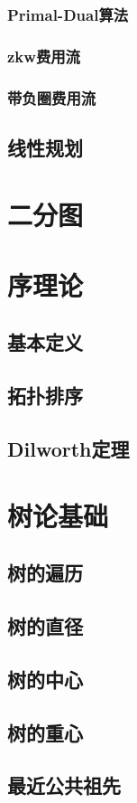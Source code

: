 \documentclass[12pt,a4paper]{article}
\begin{document}
\subsubsection{Primal-Dual算法}
\subsubsection{zkw费用流}
\subsubsection{带负圈费用流}
\subsection{线性规划}
\newpage
\section{二分图}
\section{序理论}
\subsection{基本定义}
\subsection{拓扑排序}
\subsection{Dilworth定理}
\newpage
\section{树论基础}
\subsection{树的遍历}
\subsection{树的直径}
\subsection{树的中心}
\subsection{树的重心}
\subsection{最近公共祖先}
\end{document}
